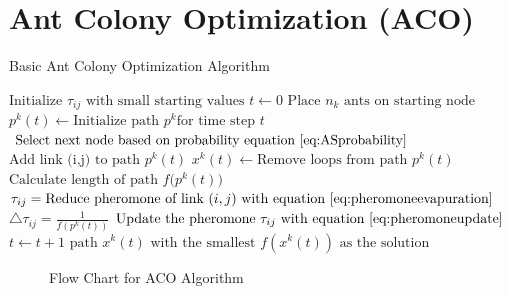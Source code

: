 \section{Ant Colony Optimization (ACO)}
\begin{algorithm}
\caption{Basic Ant Colony Optimization Algorithm~\cite{CompuIntelligenceIntro}}
\label{alg:ACO}
	\begin{algorithmic}[1]
	\STATE$\text{Initialize $\tau_{ij}$ with small starting values}$
	\STATE$t \leftarrow 0$
	\STATE$\text{Place $n_k$ ants on starting node}$
			\STATE$p^k(t) \leftarrow \text{Initialize path } p^k \text{for time step } t$
			\REPEAT
				\STATE$\text{Select next node based on probability equation~\ref{eq:ASprobability}}$
				\STATE$\text{Add link (i,j) to path } p^k(t)$
			\STATE$x^k(t) \leftarrow \text{Remove loops from path }p^k(t)$
			\STATE$\text{Calculate length of path $f(p^k(t)$})$
		\ENDFOR
			\STATE$\tau_{ij} = \text{Reduce pheromone of link $(i,j)$ with equation~\ref{eq:pheromoneevapuration}}$
		\ENDFOR
				\STATE$\triangle \tau_{ij} = \frac{1}{f(p^k(t))}$
				\STATE$\text{Update the pheromone $\tau_{ij}$ with equation~\ref{eq:pheromoneupdate}}$
			\ENDFOR
		\ENDFOR
		\STATE$t \leftarrow t + 1$
	\ENDWHILE
	\RETURN $\text{path $x^k(t)$ with the smallest $f(x^k(t))$ as the solution}$
	\end{algorithmic}
\end{algorithm}
\label{sec:ACO}
\begin{figure}[p]
	\begin{center}
	\caption{Flow Chart for ACO Algorithm}
	\label{fig:ACOAlgorithmFlowChart}
	\end{center}
\end{figure}
